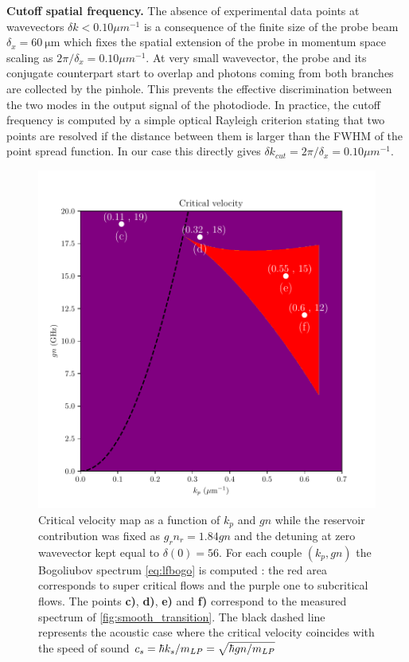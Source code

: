 \textbf{Cutoff spatial frequency.} The absence of experimental data points at wavevectors $\delta k < 0.10 \mu m^{-1}$ is a consequence of the finite size 
of the probe beam $\delta_x = \SI{60}{\micro\meter}$ which fixes the spatial extension of the probe in momentum space
 scaling as $2\pi/\delta_x=0.10 \mu m^{-1}$. At very small wavevector, the probe and its conjugate counterpart start to overlap and photons
 coming from both branches are collected by the pinhole. This prevents the effective discrimination between the two modes in the output signal of the photodiode. In practice, the 
 cutoff frequency is computed by a simple optical Rayleigh criterion stating that two points are resolved if the distance between them is larger than the FWHM of the point spread function.
In our case this directly gives $\delta k_{cut} = 2\pi/\delta_x= 0.10 \mu m^{-1}$.
\begin{figure}[h]
    \centering
    \includegraphics[width=1\textwidth]{chap_custom_st/fig/critical_velocity_map.pdf}
    \caption{Critical velocity map as a function of $k_p$ and $gn$ while the reservoir contribution was fixed as $g_rn_r= 1.84gn$ and the detuning at zero wavevector kept equal to $\delta(0)=56$. For each couple $(k_p,gn)$ the Bogoliubov spectrum \autoref{eq:lfbogo} is computed : the red area corresponds to super critical flows and the purple one to subcritical flows.
    The points \textbf{c)}, \textbf{d)}, \textbf{e)} and \textbf{f)} correspond to the measured spectrum of \autoref{fig:smooth_transition}. The black dashed line represents the acoustic case where the critical velocity coincides with the speed of sound $c_s = \hbar k_s/m_{LP}=\sqrt{\hbar gn/m_{LP}}$ }
    \label{fig:critical_velocity_map}
\end{figure}
\clearpage





